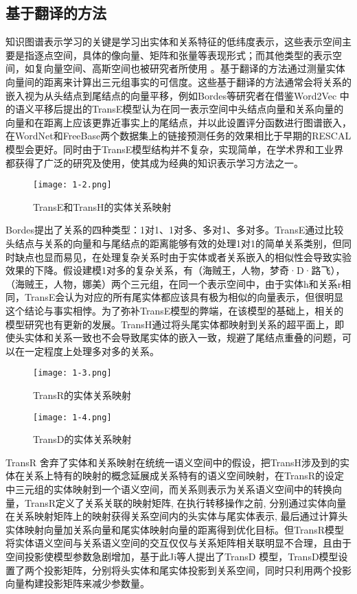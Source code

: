 \subsection{基于翻译的方法}
知识图谱表示学习的关键是学习出实体和关系特征的低纬度表示，这些表示空间主要是指逐点空间，具体的像向量、矩阵和张量等表现形式；而其他类型的表示空间，如复向量空间、高斯空间也被研究者所使用 \cite{dai2020survey}。基于翻译的方法通过测量实体向量间的距离来计算出三元组事实的可信度。这些基于翻译的方法通常会将关系的嵌入视为从头结点到尾结点的向量平移，例如Bordes等研究者在借鉴Word2Vec \cite{mikolov2013distributed}中的语义平移后提出的TransE模型认为在同一表示空间中头结点向量和关系向量的向量和在距离上应该更靠近事实上的尾结点，并以此设置评分函数进行图谱嵌入，在WordNet和FreeBase两个数据集上的链接预测任务的效果相比于早期的RESCAL \cite{nickel2011three}模型会更好。同时由于TransE模型结构并不复杂，实现简单，在学术界和工业界都获得了广泛的研究及使用，使其成为经典的知识表示学习方法之一。
\begin{figure}[h]
  \centering
  \texttt{[image: 1-2.png]}
  \caption{TransE和TransH的实体关系映射}
  \label{fig:1-2}
\end{figure}

Bordes提出了关系的四种类型：1对1、1对多、多对1、多对多。TransE通过比较头结点与关系的向量和与尾结点的距离能够有效的处理1对1的简单关系类别，但同时缺点也显而易见，在处理复杂关系时由于实体或者关系嵌入的相似性会导致实验效果的下降。假设建模1对多的复杂关系，有（海贼王，人物，梦奇·D·路飞），（海贼王，人物，娜美）两个三元组，在同一个表示空间中，由于实体h和关系r相同，TransE会认为对应的所有尾实体都应该具有极为相似的向量表示，但很明显这个结论与事实相悖。为了弥补TransE模型的弊端，在该模型的基础上，相关的模型研究也有更新的发展。TransH通过将头尾实体都映射到关系的超平面上，即使头实体和关系一致也不会导致尾实体的嵌入一致，规避了尾结点重叠的问题，可以在一定程度上处理多对多的关系。
\begin{figure}[h]
  \centering
  \texttt{[image: 1-3.png]}
  \caption{TransR的实体关系映射}
  \label{fig:1-3}
\end{figure}
\begin{figure}[h]
  \centering
  \texttt{[image: 1-4.png]}
  \caption{TransD的实体关系映射}
  \label{fig:1-4}
\end{figure}

TransR \cite{lin2015learning}舍弃了实体和关系映射在统统一语义空间中的假设，把TransH涉及到的实体在关系上特有的映射的概念延展成关系特有的语义空间映射，在TransR的设定中三元组的实体映射到一个语义空间，而关系则表示为关系语义空间中的转换向量，TransR定义了关系关联的映射矩阵, 在执行转移操作之前, 分别通过实体向量在关系映射矩阵上的映射获得关系空间内的头实体与尾实体表示, 最后通过计算头实体映射向量加关系向量和尾实体映射向量的距离得到优化目标。但TransR模型将实体语义空间与关系语义空间的交互仅仅与关系矩阵相关联明显不合理，且由于空间投影使模型参数急剧增加，基于此Ji等人提出了TransD \cite{ji2015knowledge}模型，TransD模型设置了两个投影矩阵，分别将头实体和尾实体投影到关系空间，同时只利用两个投影向量构建投影矩阵来减少参数量。

